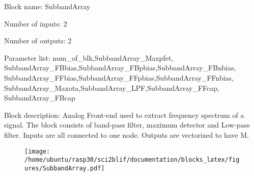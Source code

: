 \pagebreak

Block name: SubbandArray

Number of inputs: 2

Number of outputs: 2

Parameter list: num\_of\_blk,SubbandArray\_Maxpfet,\\SubbandArray\_FBbias,SubbandArray\_FBpbias,SubbandArray\_FBnbias,\\SubbandArray\_FFbias,SubbandArray\_FFpbias,SubbandArray\_FFnbias,\\SubbandArray\_Maxota,SubbandArray\_LPF,SubbandArray\_FFcap,\\SubbandArray\_FBcap

Block description: 
Analog Front-end used to extract frequency spectrum of a signal. The block consists of band-pass filter, maximum detector and Low-pass filter. 
Inputs are all connected to one node. Outputs are vectorized to have M. 

\begin{figure}[H]  %
\texttt{[image: /home/ubuntu/rasp30/sci2blif/documentation/blocks\_latex/figures/SubbandArray.pdf]}
\end{figure}


